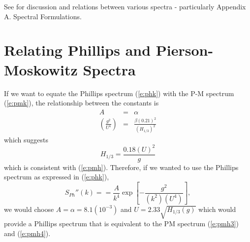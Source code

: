 \documentclass[11pt]{article}
\begin{document}
See \cite{ittc02waves} for discussion and relations between various spectra - particularly Appendix A. Spectral Formulations.

\section{Relating Phillips and Pierson-Moskowitz Spectra}
If we want to equate the Phillips spectrum (\ref{e:phk}) with the P-M spectrum  (\ref{e:pmk}), the relationship between the constants is
\begin{eqnarray}
A & = & \alpha \\
\left(\frac{g^2}{U^4}\right) & = & \frac{\beta (0.21)^2}{\left(H_{1/3}\right)^2}
\end{eqnarray}
which suggests
\begin{equation}
H_{1/3}=\frac{0.18 (U)^2}{g}
\label{e:phh}
\end{equation}
which is consistent with (\ref{e:pmh}).  Therefore, if we wanted to use the Phillips spectrum as expressed in (\ref{e:phk}),
\begin{equation} 
S_{Ph}''(k)= 
= \frac{A}{k^4} \exp{\left[ - \frac{g^2}{(k^2)(U^4)} \right]},
\end{equation}
we would choose $A=\alpha=8.1(10^{-3})$ and $U=2.33\sqrt{H_{1/3}(g)}$ which would provide a Phillips spectrum that is equivalent to the PM spectrum (\ref{e:pmh3}) and (\ref{e:pmh4}).
\newpage
\setcounter{page}{1}


\end{document}
